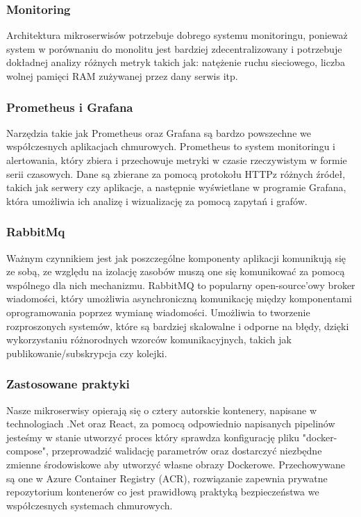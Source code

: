 \subsubsection{Monitoring}
Architektura mikroserwisów potrzebuje dobrego systemu monitoringu, ponieważ system w porównaniu do monolitu jest bardziej zdecentralizowany i potrzebuje dokładnej analizy różnych metryk takich jak: natężenie ruchu sieciowego, liczba wolnej pamięci RAM zużywanej przez dany serwis itp.

\subsubsection{Prometheus i Grafana}
Narzędzia takie jak Prometheus oraz Grafana są bardzo powszechne we współczesnych aplikacjach chmurowych. Prometheus to system monitoringu i alertowania, który zbiera i przechowuje metryki w czasie rzeczywistym w formie serii czasowych. Dane są zbierane za pomocą protokołu HTTP\linebreak z różnych źródeł, takich jak serwery czy aplikacje, a następnie wyświetlane w programie Grafana, która umożliwia ich analizę i wizualizację za pomocą zapytań i grafów.

\subsubsection{RabbitMq}
Ważnym czynnikiem jest jak poszczególne komponenty aplikacji komunikują się ze sobą, ze względu na izolację zasobów muszą one się komunikować za pomocą wspólnego dla nich mechanizmu. RabbitMQ to popularny open-source'owy broker wiadomości, który umożliwia asynchroniczną komunikację między komponentami oprogramowania poprzez wymianę wiadomości. Umożliwia to tworzenie rozproszonych systemów, które są bardziej skalowalne i odporne na błędy, dzięki wykorzystaniu różnorodnych wzorców komunikacyjnych, takich jak publikowanie/subskrypcja czy kolejki.

\subsubsection{Zastosowane praktyki}
Nasze mikroserwisy opierają się o cztery autorskie kontenery, napisane w technologiach .Net oraz React, za pomocą odpowiednio napisanych pipelinów jesteśmy w stanie utworzyć proces który sprawdza konfigurację pliku "docker-compose", przeprowadzić walidację parametrów oraz dostarczyć niezbędne zmienne środowiskowe aby utworzyć własne obrazy Dockerowe. Przechowywane są one w Azure Container Registry (ACR), rozwiązanie zapewnia prywatne repozytorium kontenerów co jest prawidłową praktyką bezpieczeństwa we współczesnych systemach chmurowych.

